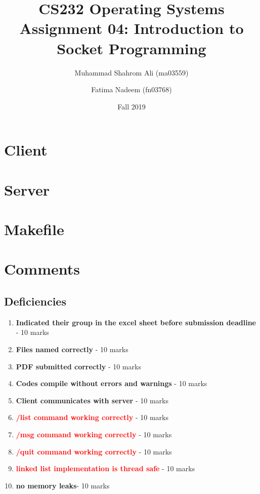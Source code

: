 \documentclass[a4paper]{article}
\newcommand\complete[1]{\textcolor{OliveGreen}{\textbf{#1}}}
\newcommand\pending[1]{\textcolor{red}{\textbf{#1}}}
\begin{document}
\title{CS232 Operating Systems \\ Assignment 04: Introduction to Socket Programming}
\author{Muhammad Shahrom Ali (ma03559) \and Fatima Nadeem (fn03768)}
\date{Fall 2019}

\maketitle


\section {Client}

\clearpage
\section {Server}

\clearpage
\section {Makefile}



\clearpage
\section {Comments}
    \subsection{Deficiencies}
        \begin{enumerate}
            \item \complete{ Indicated their group in the excel sheet before submission deadline} - 10 marks
            \item \complete{ Files named correctly} - 10 marks
            \item \complete{ PDF submitted correctly} - 10 marks
            \item \complete{ Codes compile without errors and warnings} - 10 marks
            \item \complete{ Client communicates with server} - 10 marks
            \item \pending{ /list command working correctly} - 10 marks
            \item \pending{ /msg command working correctly} - 10 marks
            \item \pending{ /quit command working correctly} - 10 marks
            \item \pending{ linked list implementation is thread safe} - 10 marks
            \item \complete{ no memory leaks}- 10 marks
        \end{enumerate}
\end{document}
